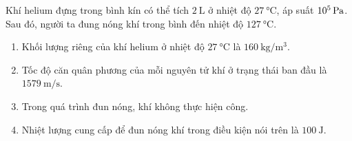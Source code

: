 \begin{ex}
	Khí helium đựng trong bình kín có thể tích $\SI{2}{\liter}$ ở nhiệt độ $\SI{27}{\celsius}$, áp suất $\SI{E5}{\pascal}$. Sau đó, người ta đung nóng khí trong bình đến nhiệt độ $\SI{127}{\celsius}$.
	\begin{enumerate}[label=\alph*)]
		\item Khối lượng riêng của khí helium ở nhiệt độ $\SI{27}{\celsius}$ là $\SI{160}{\kilogram/\meter^3}$.
		\item Tốc độ căn quân phương của mỗi nguyên tử khí ở trạng thái ban đầu là $\SI{1579}{\meter/\second}$.
		\item Trong quá trình đun nóng, khí không thực hiện công.
		\item Nhiệt lượng cung cấp để đun nóng khí trong điều kiện nói trên là $\SI{100}{\joule}$.
	\end{enumerate}
	
\end{ex}
